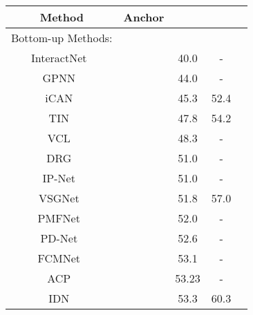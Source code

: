 \documentclass[10pt,twocolumn,letterpaper]{article}
\newcommand{\xmark}{\ding{55}}\newcommand{\cmark}{\ding{51}}
\begin{document}
\begin{table}[t]
\small
  \begin{center}
  \begin{tabular}{ccccc}
  \hline
  Method        &Anchor  &  &  \\
  \hline\hline
  Bottom-up Methods:                  &                       & \\
  InteractNet~\cite{gkioxari2018detecting}		&\xmark				    &40.0  &-\\
  GPNN~\cite{qi2018learning}    &\xmark				    &44.0  &-\\
  iCAN~\cite{gao2018ican}	      		&\xmark				    &45.3  &52.4\\
  TIN~\cite{li2018transferable}      		&\xmark				    &47.8  &54.2\\
  VCL~\cite{hou2020visual}      		&\xmark				    &48.3  &-\\
  DRG~\cite{Gao-ECCV-DRG}				&\xmark		        &51.0  &-\\
  IP-Net~\cite{wang2020learning}		&\xmark				    &51.0  &-\\
  VSGNet~\cite{Ulutan_2020_CVPR}			&\xmark				    &51.8  &57.0\\ 
  PMFNet~\cite{Wan_2019_ICCV}		&\xmark               &52.0  &-\\ 
  PD-Net~\cite{zhong2020polysemy}			&\xmark               &52.6  &-\\
  FCMNet~\cite{Liu20a}				&\xmark		            &53.1  &-\\
  ACP~\cite{kim2020detecting}		&\xmark	&53.23  &-\\
  IDN~\cite{li2020hoi}			&\xmark		            &53.3  &60.3\\
  

\end{tabular}
\end{center}
\end{table}
\end{document}
